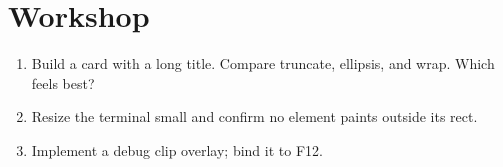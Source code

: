 \section*{Workshop}

\begin{enumerate}[leftmargin=*]
  \item Build a card with a long title. Compare truncate,
    ellipsis, and wrap. Which feels best?
  \item Resize the terminal small and confirm no element
    paints outside its rect.
  \item Implement a debug clip overlay; bind it to F12.
\end{enumerate}
